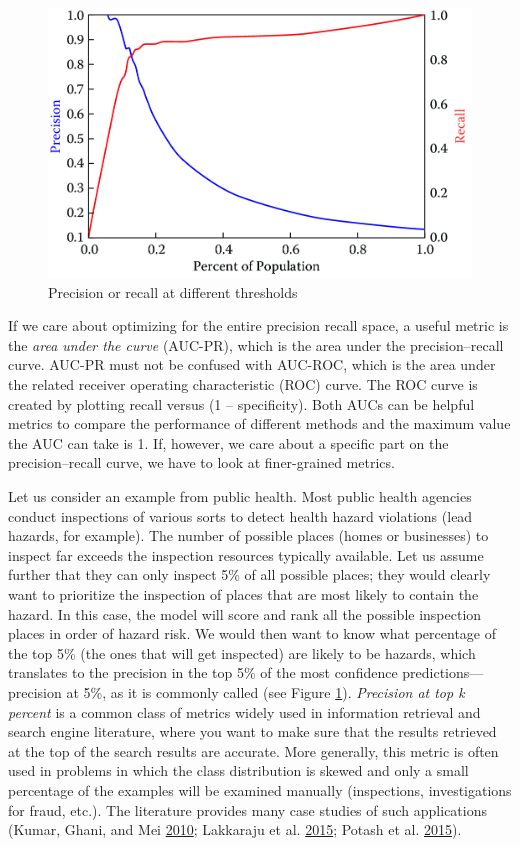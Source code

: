 \documentclass[]{krantz}
\begin{document}
\begin{figure}

{\centering \includegraphics[width=0.7\linewidth]{ChapterML/figures/pr2} 

}

\caption{Precision or recall at different thresholds}\label{fig:pr2}
\end{figure}

If we care about optimizing for the entire precision recall space, a
useful metric is the \emph{area under the curve} (AUC-PR), which is the
area under the precision--recall curve. AUC-PR must not be confused with
AUC-ROC, which is the area under the related receiver operating
characteristic (ROC) curve. The ROC curve is created by plotting recall
versus (1 -- specificity). Both AUCs can be helpful metrics to compare
the performance of different methods and the maximum value the AUC can
take is 1. If, however, we care about a specific part on the
precision--recall curve, we have to look at finer-grained metrics.

Let us consider an example from public health. Most public health
agencies conduct inspections of various sorts to detect health hazard
violations (lead hazards, for example). The number of possible places
(homes or businesses) to inspect far exceeds the inspection resources
typically available. Let us assume further that they can only inspect
5\% of all possible places; they would clearly want to prioritize the
inspection of places that are most likely to contain the hazard. In this
case, the model will score and rank all the possible inspection places
in order of hazard risk. We would then want to know what percentage of
the top 5\% (the ones that will get inspected) are likely to be hazards,
which translates to the precision in the top 5\% of the most confidence
predictions---precision at 5\%, as it is commonly called (see Figure
\ref{fig:pr2}). \emph{Precision at top k percent} is a common class of
metrics widely used in information retrieval and search engine
literature, where you want to make sure that the results retrieved at
the top of the search results are accurate. More generally, this metric
is often used in problems in which the class distribution is skewed and
only a small percentage of the examples will be examined manually
(inspections, investigations for fraud, etc.). The literature provides
many case studies of such applications (Kumar, Ghani, and Mei
\protect\hyperlink{ref-Kumar2010}{2010}; Lakkaraju et al.
\protect\hyperlink{ref-Lakkaraju2015}{2015}; Potash et al.
\protect\hyperlink{ref-Potash2015}{2015}).
\end{document}
